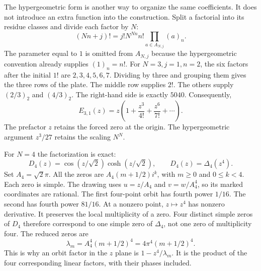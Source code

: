 The hypergeometric form is another way to organize the same coefficients. It does not introduce an extra function into the construction. Split a factorial into its residue classes and divide each factor by $N$:
\[
(Nn+j)!=j!N^{Nn}n!\prod_{a\in A_{N,j}}(a)_n.
\]
The parameter equal to $1$ is omitted from $A_{N,j}$ because the hypergeometric convention already supplies $(1)_n=n!$.
For $N=3,j=1,n=2$, the six factors after the initial $1!$ are $2,3,4,5,6,7$. Dividing by three and grouping them gives the three rows of the plate. The middle row supplies $2!$. The others supply $(2/3)_2$ and $(4/3)_2$. The right-hand side is exactly $5040$.
Consequently,
\[
E_{3,1}(z)=z\left(1+\frac{z^3}{4!}+\frac{z^6}{7!}+\cdots\right).
\]
The prefactor $z$ retains the forced zero at the origin. The hypergeometric argument $z^3/27$ retains the scaling $N^N$.

For $N=4$ the factorization is exact:
\[
D_4(z)=\cos(z/\sqrt2)\cosh(z/\sqrt2),\qquad D_4(z)=\Delta_4(z^4).
\]
Set $A_4=\sqrt2\pi$. All the zeros are $A_4(m+1/2)i^k$, with $m\ge0$ and $0\le k<4$. Each zero is simple.
The drawing uses $u=z/A_4$ and $v=w/A_4^4$, so its marked coordinates are rational. The first four-point orbit has fourth power $1/16$. The second has fourth power $81/16$.
At a nonzero point, $z\mapsto z^4$ has nonzero derivative. It preserves the local multiplicity of a zero. Four distinct simple zeros of $D_4$ therefore correspond to one simple zero of $\Delta_4$, not one zero of multiplicity four.
The reduced zeros are
\[
\lambda_m=A_4^4(m+1/2)^4=4\pi^4(m+1/2)^4.
\]
This is why an orbit factor in the $z$ plane is $1-z^4/\lambda_m$. It is the product of the four corresponding linear factors, with their phases included.

